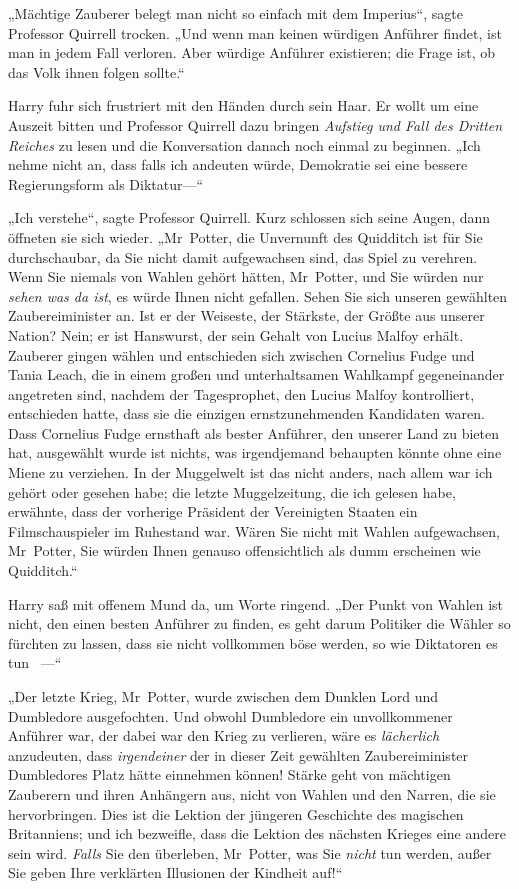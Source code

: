 {„Mächtige Zauberer belegt man nicht so einfach mit dem Imperius“, sagte Professor Quirrell trocken. „Und wenn man keinen würdigen Anführer findet, ist man in jedem Fall verloren. Aber würdige Anführer existieren; die Frage ist, ob das Volk ihnen folgen sollte.“

Harry fuhr sich frustriert mit den Händen durch sein Haar. Er wollt um eine Auszeit bitten und Professor Quirrell dazu bringen \emph{Aufstieg und Fall des Dritten Reiches} zu lesen und die Konversation danach noch einmal zu beginnen. „Ich nehme nicht an, dass falls ich andeuten würde, Demokratie sei eine bessere Regierungsform als Diktatur—“

„Ich verstehe“, sagte Professor Quirrell. Kurz schlossen sich seine Augen, dann öffneten sie sich wieder. „Mr~Potter, die Unvernunft des Quidditch ist für Sie durchschaubar, da Sie nicht damit aufgewachsen sind, das Spiel zu verehren. Wenn Sie niemals von Wahlen gehört hätten, Mr~Potter, und Sie würden nur \emph{sehen was da ist}, es würde Ihnen nicht gefallen. Sehen Sie sich unseren gewählten Zaubereiminister an. Ist er der Weiseste, der Stärkste, der Größte aus unserer Nation? Nein; er ist Hanswurst, der sein Gehalt von Lucius Malfoy erhält. Zauberer gingen wählen und entschieden sich zwischen Cornelius Fudge und Tania Leach, die in einem großen und unterhaltsamen Wahlkampf gegeneinander angetreten sind, nachdem der Tagesprophet, den Lucius Malfoy kontrolliert, entschieden hatte, dass sie die einzigen ernstzunehmenden Kandidaten waren. Dass Cornelius Fudge ernsthaft als bester Anführer, den unserer Land zu bieten hat, ausgewählt wurde ist nichts, was irgendjemand behaupten könnte ohne eine Miene zu verziehen. In der Muggelwelt ist das nicht anders, nach allem war ich gehört oder gesehen habe; die letzte Muggelzeitung, die ich gelesen habe, erwähnte, dass der vorherige Präsident der Vereinigten Staaten ein Filmschauspieler im Ruhestand war. Wären Sie nicht mit Wahlen aufgewachsen, Mr~Potter, Sie würden Ihnen genauso offensichtlich als dumm erscheinen wie Quidditch.“

Harry saß mit offenem Mund da, um Worte ringend. „Der Punkt von Wahlen ist nicht, den einen besten Anführer zu finden, es geht darum Politiker die Wähler so fürchten zu lassen, dass sie nicht vollkommen böse werden, so wie Diktatoren es tun ~—“

„Der letzte Krieg, Mr~Potter, wurde zwischen dem Dunklen Lord und Dumbledore ausgefochten. Und obwohl Dumbledore ein unvollkommener Anführer war, der dabei war den Krieg zu verlieren, wäre es \emph{lächerlich} anzudeuten, dass \emph{irgendeiner} der in dieser Zeit gewählten Zaubereiminister Dumbledores Platz hätte einnehmen können! Stärke geht von mächtigen Zauberern und ihren Anhängern aus, nicht von Wahlen und den Narren, die sie hervorbringen. Dies ist die Lektion der jüngeren Geschichte des magischen Britanniens; und ich bezweifle, dass die Lektion des nächsten Krieges eine andere sein wird. \emph{Falls} Sie den überleben, Mr~Potter, was Sie \emph{nicht} tun werden, außer Sie geben Ihre verklärten Illusionen der Kindheit auf!“

}
